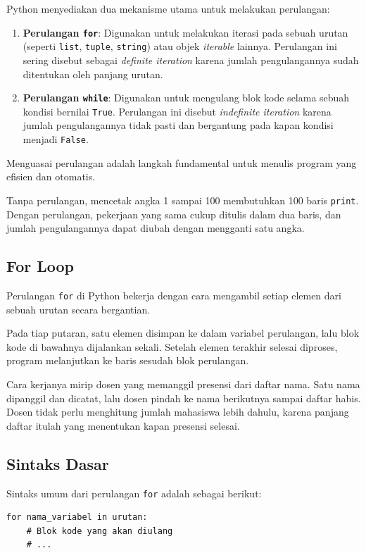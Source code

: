 Python menyediakan dua mekanisme utama untuk melakukan perulangan:
\begin{enumerate}
    \item \textbf{Perulangan \texttt{for}}: Digunakan untuk melakukan iterasi pada sebuah urutan (seperti \texttt{list}, \texttt{tuple}, \texttt{string}) atau objek \textit{iterable} lainnya. Perulangan ini sering disebut sebagai \textit{definite iteration} karena jumlah pengulangannya sudah ditentukan oleh panjang urutan.
    \item \textbf{Perulangan \texttt{while}}: Digunakan untuk mengulang blok kode selama sebuah kondisi bernilai \texttt{True}. Perulangan ini disebut \textit{indefinite iteration} karena jumlah pengulangannya tidak pasti dan bergantung pada kapan kondisi menjadi \texttt{False}.
\end{enumerate}

Menguasai perulangan adalah langkah fundamental untuk menulis program yang efisien dan otomatis.

Tanpa perulangan, mencetak angka 1 sampai 100 membutuhkan 100 baris \texttt{print}. Dengan perulangan, pekerjaan yang sama cukup ditulis dalam dua baris, dan jumlah pengulangannya dapat diubah dengan mengganti satu angka.

\subsection{For Loop}

Perulangan \texttt{for} di Python bekerja dengan cara mengambil setiap elemen dari sebuah urutan secara bergantian.

Pada tiap putaran, satu elemen disimpan ke dalam variabel perulangan, lalu blok kode di bawahnya dijalankan sekali. Setelah elemen terakhir selesai diproses, program melanjutkan ke baris sesudah blok perulangan.

Cara kerjanya mirip dosen yang memanggil presensi dari daftar nama. Satu nama dipanggil dan dicatat, lalu dosen pindah ke nama berikutnya sampai daftar habis. Dosen tidak perlu menghitung jumlah mahasiswa lebih dahulu, karena panjang daftar itulah yang menentukan kapan presensi selesai.

\subsection{Sintaks Dasar}
Sintaks umum dari perulangan \texttt{for} adalah sebagai berikut:
\begin{lstlisting}[style=PythonStyle, caption={Sintaks Dasar Perulangan for}, label={lst:b5-sintaks-for}]
for nama_variabel in urutan:
    # Blok kode yang akan diulang
    # ...
\end{lstlisting}


